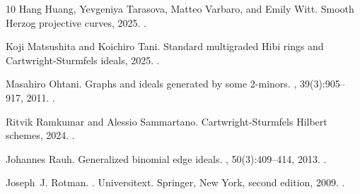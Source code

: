 \documentclass{amsart}
\theoremstyle{definition}
\numberwithin{equation}{section}
\begin{document}
\begin{thebibliography}{10}
Hang Huang, Yevgeniya Tarasova, Matteo Varbaro, and Emily Witt.
\newblock Smooth {H}erzog projective curves, 2025.
\newblock \href {https://arxiv.org/abs/2512.00584} {}.

Koji Matsushita and Koichiro Tani.
\newblock Standard multigraded {H}ibi rings and {C}artwright-{S}turmfels
  ideals, 2025.
\newblock \href {https://arxiv.org/abs/2505.06837} {}.

Masahiro Ohtani.
\newblock Graphs and ideals generated by some 2-minors.
, 39(3):905--917, 2011.
\newblock \href {https://doi.org/10.1080/00927870903527584}
  {}.

Ritvik Ramkumar and Alessio Sammartano.
\newblock Cartwright-{S}turmfels {H}ilbert schemes, 2024.
\newblock \href {https://arxiv.org/abs/2410.10478} {}.

Johannes Rauh.
\newblock Generalized binomial edge ideals.
, 50(3):409--414, 2013.
\newblock \href {https://doi.org/10.1016/j.aam.2012.08.009}
  {}.

Joseph~J. Rotman.
.
\newblock Universitext. Springer, New York, second edition, 2009.
\newblock \href {https://doi.org/10.1007/b98977} {}.

\end{thebibliography}
  
\end{document}
